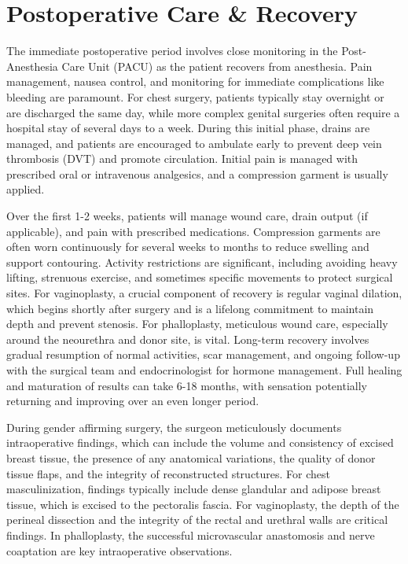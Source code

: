 \section*{Postoperative Care \& Recovery}
The immediate postoperative period involves close monitoring in the Post-Anesthesia Care Unit (PACU) as the patient recovers from anesthesia. Pain management, nausea control, and monitoring for immediate complications like bleeding are paramount. For chest surgery, patients typically stay overnight or are discharged the same day, while more complex genital surgeries often require a hospital stay of several days to a week. During this initial phase, drains are managed, and patients are encouraged to ambulate early to prevent deep vein thrombosis (DVT) and promote circulation. Initial pain is managed with prescribed oral or intravenous analgesics, and a compression garment is usually applied.

Over the first 1-2 weeks, patients will manage wound care, drain output (if applicable), and pain with prescribed medications. Compression garments are often worn continuously for several weeks to months to reduce swelling and support contouring. Activity restrictions are significant, including avoiding heavy lifting, strenuous exercise, and sometimes specific movements to protect surgical sites. For vaginoplasty, a crucial component of recovery is regular vaginal dilation, which begins shortly after surgery and is a lifelong commitment to maintain depth and prevent stenosis. For phalloplasty, meticulous wound care, especially around the neourethra and donor site, is vital. Long-term recovery involves gradual resumption of normal activities, scar management, and ongoing follow-up with the surgical team and endocrinologist for hormone management. Full healing and maturation of results can take 6-18 months, with sensation potentially returning and improving over an even longer period.

During gender affirming surgery, the surgeon meticulously documents intraoperative findings, which can include the volume and consistency of excised breast tissue, the presence of any anatomical variations, the quality of donor tissue flaps, and the integrity of reconstructed structures. For chest masculinization, findings typically include dense glandular and adipose breast tissue, which is excised to the pectoralis fascia. For vaginoplasty, the depth of the perineal dissection and the integrity of the rectal and urethral walls are critical findings. In phalloplasty, the successful microvascular anastomosis and nerve coaptation are key intraoperative observations.

